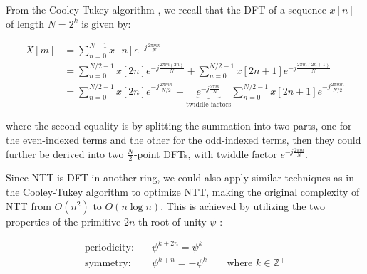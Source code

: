 \documentclass[12pt]{article}
\begin{document}




From the Cooley-Tukey algorithm \cite[p.~370]{ADSP5}, 
we recall that the DFT of a sequence $x[n]$ of length $N = 2^k$ is given by:

\begin{align*}
    X[m] 
    &= \sum_{n = 0}^{N - 1} x[n] e^{-j \frac{2 \pi m n}{N}} \\
    &= \sum_{n = 0}^{N/2 - 1} x[2n] e^{-j \frac{2 \pi m (2n)}{N}} + \sum_{n = 0}^{N/2 - 1} x[2n + 1] e^{-j \frac{2 \pi m (2n + 1)}{N}} \\
    &= \sum_{n = 0}^{N/2 - 1} x[2n] e^{-j \frac{2 \pi m n}{N/2}} + \underbrace{e^{-j \frac{2 \pi m}{N}}}_{\text{twiddle factors}} \sum_{n = 0}^{N/2 - 1} x[2n + 1] e^{-j \frac{2 \pi m n}{N/2}} 
\end{align*}

where the second equality is by splitting the summation into two parts, 
one for the even-indexed terms and the other for the odd-indexed terms, 
then they could further be derived into two $\frac{N}{2}$-point DFTs, with twiddle factor $e^{-j \frac{2 \pi m}{N}}$.

Since NTT is DFT in another ring, we could also apply similar techniques as in the Cooley-Tukey algorithm to optimize NTT, 
making the original complexity of NTT from $O(n^2)$ to $O(n \log n)$. 
This is achieved by utilizing the two properties of the primitive $2n$-th root of unity $\psi$ \cite[p.~11]{beginner_guide}:

\begin{align*}
    \text{periodicity:}& \quad \psi^{k + 2n} = \psi^k \\
    \text{symmetry:}& \quad \psi^{k + n} = -\psi^k \qquad \text{where } k \in \mathbb{Z}^+
\end{align*}
\end{document}
